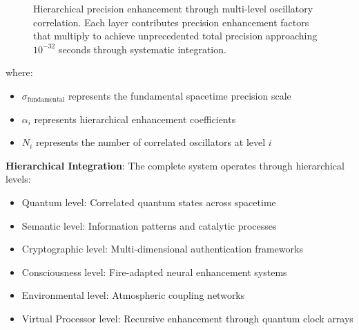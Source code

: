 \documentclass[12pt,a4paper]{article}
\begin{document}
{\begin{figure}[h]
\caption{Hierarchical precision enhancement through multi-level oscillatory correlation. Each layer contributes precision enhancement factors that multiply to achieve unprecedented total precision approaching $10^{-32}$ seconds through systematic integration.}
\label{fig:hierarchical_precision}
\end{figure}

where:
\begin{itemize}
\item $\sigma_{\text{fundamental}}$ represents the fundamental spacetime precision scale
\item $\alpha_i$ represents hierarchical enhancement coefficients
\item $N_i$ represents the number of correlated oscillators at level $i$
\end{itemize}

\textbf{Hierarchical Integration}: The complete system operates through hierarchical levels:
\begin{itemize}
\item Quantum level: Correlated quantum states across spacetime
\item Semantic level: Information patterns and catalytic processes
\item Cryptographic level: Multi-dimensional authentication frameworks
\item Consciousness level: Fire-adapted neural enhancement systems
\item Environmental level: Atmospheric coupling networks
\item Virtual Processor level: Recursive enhancement through quantum clock arrays
\end{itemize}

}
\end{document}
